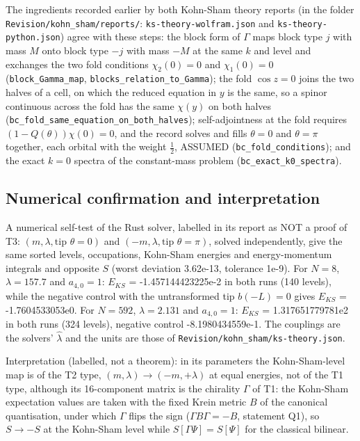 \documentclass[11pt]{article}
\begin{document}
The ingredients recorded earlier by both Kohn-Sham theory reports (in the folder \texttt{Revision\allowbreak{}/kohn\_sh\allowbreak{}am/repor\allowbreak{}ts/}: \texttt{ks-theor\allowbreak{}y-wolfra\allowbreak{}m.json} and \texttt{ks-theor\allowbreak{}y-python\allowbreak{}.json}) agree with these steps: the block form of $\Gamma$ maps block type $j$ with mass $M$ onto block type $-j$ with mass $-M$ at the same $k$ and level and exchanges the two fold conditions $\chi_2(0) = 0$ and $\chi_1(0) = 0$ (\texttt{block\_Ga\allowbreak{}mma\_map}, \texttt{blocks\_r\allowbreak{}elation\_\allowbreak{}to\_Gamma}); the fold $\cos z = 0$ joins the two halves of a cell, on which the reduced equation in $y$ is the same, so a spinor continuous across the fold has the same $\chi(y)$ on both halves (\texttt{bc\_fold\_\allowbreak{}same\_equ\allowbreak{}ation\_on\allowbreak{}\_both\_ha\allowbreak{}lves}); self-adjointness at the fold requires $(1 - Q(\theta))\chi(0) = 0$, and the record solves and fills $\theta = 0$ and $\theta = \pi$ together, each orbital with the weight $\frac12$, ASSUMED (\texttt{bc\_fold\_\allowbreak{}conditio\allowbreak{}ns}); and the exact $k = 0$ spectra of the constant-mass problem (\texttt{bc\_exact\allowbreak{}\_k0\_spec\allowbreak{}tra}).

\subsection{Numerical confirmation and interpretation}

A numerical self-test of the Rust solver, labelled in its report as NOT a proof of T3: $(m, \lambda, \text{tip } \theta = 0)$ and $(-m, \lambda, \text{tip } \theta = \pi)$, solved independently, give the same sorted levels, occupations, Kohn-Sham energies and energy-momentum integrals and opposite $S$ (worst deviation 3.62e-13, tolerance 1e-9). For $N = 8$, $\lambda = 157.7$ and $a_{4,0} = 1$: $E_{KS}$ = -1.457144423225e-2 in both runs (140 levels), while the negative control with the untransformed tip $b(-L) = 0$ gives $E_{KS}$ = -1.7604533053e0. For $N = 592$, $\lambda = 2.131$ and $a_{4,0} = 1$: $E_{KS}$ = 1.317651779781e2 in both runs (324 levels), negative control -8.1980434559e-1. The couplings are the solvers' $\hat\lambda$ and the units are those of \texttt{Revision\allowbreak{}/kohn\_sh\allowbreak{}am/ks-th\allowbreak{}eory.jso\allowbreak{}n}.

Interpretation (labelled, not a theorem): in its parameters the Kohn-Sham-level map is of the T2 type, $(m,\lambda) \to (-m,+\lambda)$ at equal energies, not of the T1 type, although its 16-component matrix is the chirality $\Gamma$ of T1: the Kohn-Sham expectation values are taken with the fixed Krein metric $B$ of the canonical quantisation, under which $\Gamma$ flips the sign ($\Gamma B\Gamma = -B$, statement Q1), so $S \to -S$ at the Kohn-Sham level while $S[\Gamma\Psi] = S[\Psi]$ for the classical bilinear.
\end{document}
